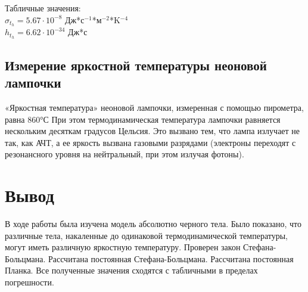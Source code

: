 \documentclass[a4paper]{article}
\begin{document}
\begin{center}
 Табличные значения:\\
$\sigma_t_h = 5.67\cdot 10^{-8}$ Дж*с$^{-1}$*м$^{-2}$*K$^{-4}$ \\
$h_t_h = 6.62\cdot 10^{-34}$ Дж*с
\end{center}
\subsection{Измерение яркостной температуры неоновой лампочки}
«Яркостная температура» неоновой лампочки, измеренная с помощью пирометра, 
равна 860°С При этом термодинамическая температура лампочки равняется нескольким 
десяткам градусов Цельсия. Это вызвано тем, что лампа излучает не так, как АЧТ, а ее яркость вызвана газовыми разрядами (электроны переходят с резонансного уровня на нейтральный, при этом излучая фотоны).
\section{Вывод}
В ходе работы была изучена модель абсолютно черного тела.
Было показано, что  различные  тела, накаленные  до  одинаковой  термодинамической 
температуры, могут иметь различную яркостную температуру. Проверен закон Стефана-Больцмана. Рассчитана постоянная Стефана-Больцмана. Рассчитана постоянная Планка. Все полученные значения сходятся с табличными в пределах погрешности.
\end{document}
